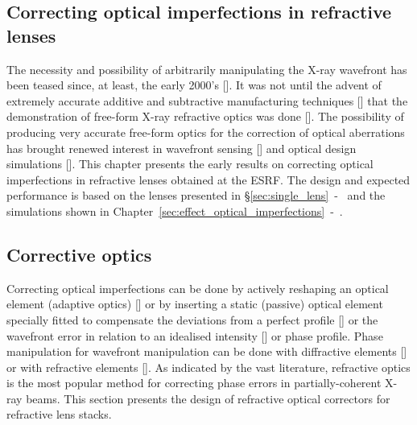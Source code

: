 \begin{refsection}
\chapter{Correcting optical imperfections in refractive lenses}\label{sec:corrections}

The necessity and possibility of arbitrarily manipulating the X-ray wavefront has been teased since, at least, the early 2000's [\cite{Chubar1999, Chubar2001b}]. It was not until the advent of extremely accurate additive and subtractive manufacturing techniques [\cite{Stohr2015, Polikarpov2016, Petrov2017, Roth2018, Sanli2018, Seiboth2019, Abrashitova2020, Antipov2020, Lin2020, Medvedskaya2020}] that the demonstration of free-form X-ray refractive optics was done [\cite{Sawhney2016,Seiboth2017,Laundy2019, Seiboth2020}]. The possibility of producing very accurate free-form optics for the correction of optical aberrations has brought renewed interest in wavefront sensing [\cite{Berujon2015, Seaberg2019}] and optical design simulations [\cite{Laundy2020}]. This chapter presents the early results on correcting optical imperfections in refractive lenses obtained at the ESRF. The design and expected performance is based on the lenses presented in \S\ref{sec:single_lens}~-~\textit{} and the simulations shown in Chapter~\ref{sec:effect_optical_imperfections}~-~\textit{}.

\section{Corrective optics}\label{sec:corrective_optics}

Correcting optical imperfections can be done by actively reshaping an optical element (adaptive optics) [\cite{Sutter2012, Alcock2013}] or by inserting a static (passive) optical element specially fitted to compensate the deviations from a perfect profile [\cite{Morawe2019}] or the wavefront error in relation to an idealised intensity [\cite{Donato2020}] or phase profile. Phase manipulation for wavefront manipulation can be done with diffractive elements [\cite{Probst2020}] or with refractive elements [\cite{Sawhney2016,Seiboth2017,Laundy2019,Seiboth2020}]. As indicated by the vast literature, refractive optics is the most popular method for correcting phase errors in partially-coherent X-ray beams. This section presents the design of refractive optical correctors for refractive lens stacks.


\end{refsection}
